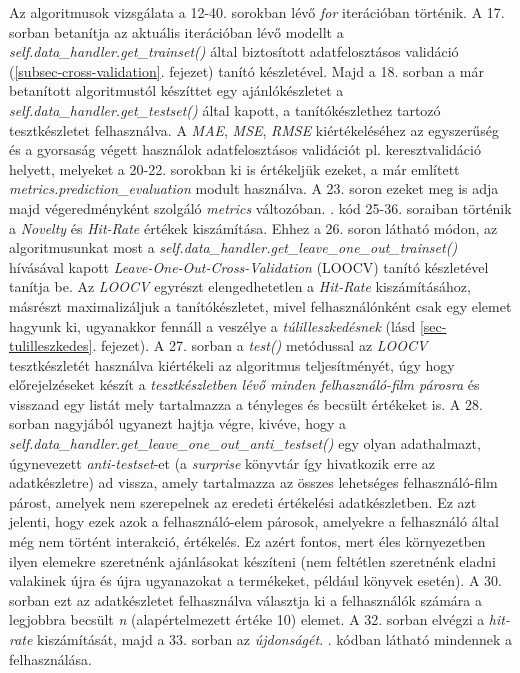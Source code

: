 \documentclass[
]{thesis-ekf}
\theoremstyle{definition}
\theoremstyle{remark}
\begin{document}
Az algoritmusok vizsgálata a 12-40. sorokban lévő \emph{for} iterációban történik. A 17. sorban betanítja az aktuális iterációban lévő modellt a \emph{self.data\_handler.get\_trainset()} által biztosított  adatfelosztásos validáció (\ref{subsec-cross-validation}. fejezet) tanító készletével. Majd a 18. sorban a már betanított algoritmustól készíttet egy ajánlókészletet a  \emph{self.data\_handler.\allowbreak{}get\_testset()} által kapott, a tanítókészlethez tartozó tesztkészletet felhasználva. A \emph{MAE}, \emph{MSE}, \emph{RMSE} kiértékeléséhez az egyszerűség és a gyorsaság végett használok adatfelosztásos validációt pl. keresztvalidáció helyett, melyeket a 20-22. sorokban ki is értékeljük ezeket, a már említett \emph{metrics.prediction\_evaluation} modult használva. A 23. soron ezeket meg is adja majd végeredményként szolgáló \emph{metrics} változóban.
. kód 25-36. soraiban történik a \emph{Novelty} és \emph{Hit-Rate} értékek kiszámítása. Ehhez a 26. soron látható módon, az algoritmusunkat most a \emph{self.data\_handler.get\_leave\_one\_out\_\allowbreak{}trainset()} hívásával kapott \emph{Leave-One-Out-Cross-Validation} (LOOCV) tanító készletével tanítja be. Az \emph{LOOCV} egyrészt elengedhetetlen a \emph{Hit-Rate} kiszámításához, másrészt maximalizáljuk a tanítókészletet, mivel felhasználónként csak egy elemet hagyunk ki, ugyanakkor fennáll a veszélye a \emph{túlilleszkedésnek} (lásd \ref{sec-tulilleszkedes}. fejezet). A 27. sorban a \emph{test()} metódussal az \emph{LOOCV} tesztkészletét használva kiértékeli az algoritmus teljesítményét, úgy hogy előrejelzéseket készít a \emph{tesztkészletben lévő minden felhasználó-film párosra} és visszaad egy listát mely tartalmazza a tényleges és becsült értékeket is. A 28. sorban nagyjából ugyanezt hajtja végre, kivéve, hogy a \emph{self.data\_handler.get\allowbreak\_leave\allowbreak\_one\allowbreak\_out\allowbreak\_anti\allowbreak\_testset()} egy olyan adathalmazt, úgynevezett \emph{anti-testset}-et\label{anti-testset} (a \emph{surprise} könyvtár így hivatkozik erre az adatkészletre) ad vissza, amely tartalmazza az összes lehetséges felhasználó-film párost, amelyek nem szerepelnek az eredeti értékelési adatkészletben. Ez azt jelenti, hogy ezek azok a felhasználó-elem párosok, amelyekre a felhasználó által még nem történt interakció, értékelés. Ez azért fontos, mert éles környezetben ilyen elemekre szeretnénk ajánlásokat készíteni (nem feltétlen szeretnénk eladni valakinek újra és újra ugyanazokat a termékeket, például könyvek esetén). A 30. sorban ezt az adatkészletet felhasználva választja ki a felhasználók számára a legjobbra becsült \emph{n} (alapértelmezett értéke 10) elemet. A 32. sorban elvégzi a \emph{hit-rate} kiszámítását, majd a 33. sorban az \emph{újdonságét}. . kódban látható mindennek a felhasználása.
\end{document}
